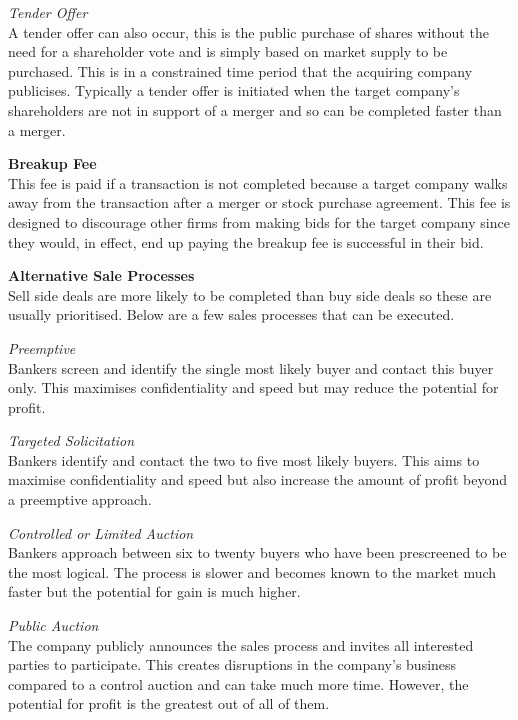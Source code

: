 \documentclass[10pt, a4paper]{article}
\begin{document}
\vspace{5pt}
\noindent \textit{Tender Offer}\\
A tender offer can also occur, this is the public purchase of shares without the need for a shareholder vote and is simply based on market supply to be purchased. This is in a constrained time period that the acquiring company publicises. Typically a tender offer is initiated when the target company's shareholders are not in support of a merger and so can be completed faster than a merger.

\vspace{10pt}
\noindent \textbf{Breakup Fee}\\
This fee is paid if a transaction is not completed because a target company walks away from the transaction after a merger or stock purchase agreement. This fee is designed to discourage other firms from making bids for the target company since they would, in effect, end up paying the breakup fee is successful in their bid. 

\vspace{10pt}
\noindent \textbf{Alternative Sale Processes}\\
Sell side deals are more likely to be completed than buy side deals so these are usually prioritised. Below are a few sales processes that can be executed.

\vspace{5pt}
\noindent \textit{Preemptive}\\
Bankers screen and identify the single most likely buyer and contact this buyer only. This maximises confidentiality and speed but may reduce the potential for profit.

\vspace{5pt}
\noindent \textit{Targeted Solicitation}\\
Bankers identify and contact the two to five most likely buyers. This aims to maximise confidentiality and speed but also increase the amount of profit beyond a preemptive approach.

\vspace{5pt}
\noindent \textit{Controlled or Limited Auction}\\
Bankers approach between six to twenty buyers who have been prescreened to be the most logical. The process is slower and becomes known to the market much faster but the potential for gain is much higher.

\vspace{5pt}
\noindent \textit{Public Auction}\\
The company publicly announces the sales process and invites all interested parties to participate. This creates disruptions in the company's business compared to a control auction and can take much more time. However, the potential for profit is the greatest out of all of them.
\end{document}
